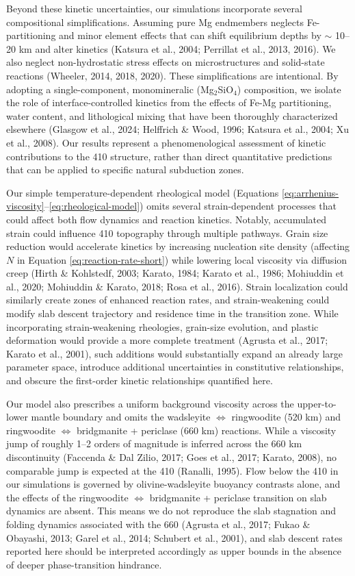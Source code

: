 \documentclass[draft,linenumbers]{agujournal2019}
\begin{document}
Beyond these kinetic uncertainties, our simulations incorporate several
compositional simplifications. Assuming pure Mg endmembers neglects
Fe-partitioning and minor element effects that can shift equilibrium
depths by \(\sim\) 10--20 km and alter kinetics ({Katsura et al.}, 2004;
Perrillat et al., 2013, 2016). We also neglect non-hydrostatic stress
effects on microstructures and solid-state reactions (Wheeler, 2014,
2018, 2020). These simplifications are intentional. By adopting a
single-component, monomineralic (Mg\(_2\)SiO\(_4\)) composition, we
isolate the role of interface-controlled kinetics from the effects of
Fe-Mg partitioning, water content, and lithological mixing that have
been thoroughly characterized elsewhere (Glasgow et al., 2024; Helffrich
\& Wood, 1996; {Katsura et al.}, 2004; Xu et al., 2008). Our results
represent a phenomenological assessment of kinetic contributions to the
410 structure, rather than direct quantitative predictions that can be
applied to specific natural subduction zones.

Our simple temperature-dependent rheological model (Equations
\ref{eq:arrhenius-viscosity}--\ref{eq:rheological-model}) omits several
strain-dependent processes that could affect both flow dynamics and
reaction kinetics. Notably, accumulated strain could influence 410
topography through multiple pathways. Grain size reduction would
accelerate kinetics by increasing nucleation site density (affecting
\(N\) in Equation \ref{eq:reaction-rate-short}) while lowering local
viscosity via diffusion creep (Hirth \& Kohlstedf, 2003; Karato, 1984;
Karato et al., 1986; Mohiuddin et al., 2020; Mohiuddin \& Karato, 2018;
Rosa et al., 2016). Strain localization could similarly create zones of
enhanced reaction rates, and strain-weakening could modify slab descent
trajectory and residence time in the transition zone. While
incorporating strain-weakening rheologies, grain-size evolution, and
plastic deformation would provide a more complete treatment (Agrusta et
al., 2017; Karato et al., 2001), such additions would substantially
expand an already large parameter space, introduce additional
uncertainties in constitutive relationships, and obscure the first-order
kinetic relationships quantified here.

Our model also prescribes a uniform background viscosity across the
upper-to-lower mantle boundary and omits the wadsleyite
\(\Leftrightarrow\) ringwoodite (520 km) and ringwoodite
\(\Leftrightarrow\) bridgmanite + periclase (660 km) reactions. While a
viscosity jump of roughly 1--2 orders of magnitude is inferred across
the 660 km discontinuity (Faccenda \& Dal Zilio, 2017; Goes et al.,
2017; Karato, 2008), no comparable jump is expected at the 410 (Ranalli,
1995). Flow below the 410 in our simulations is governed by
olivine-wadsleyite buoyancy contrasts alone, and the effects of the
ringwoodite \(\Leftrightarrow\) bridgmanite + periclase transition on
slab dynamics are absent. This means we do not reproduce the slab
stagnation and folding dynamics associated with the 660 (Agrusta et al.,
2017; Fukao \& Obayashi, 2013; Garel et al., 2014; Schubert et al.,
2001), and slab descent rates reported here should be interpreted
accordingly as upper bounds in the absence of deeper phase-transition
hindrance.
\end{document}
